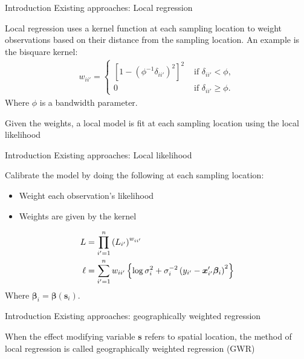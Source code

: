 \documentclass[12pt,t,handout]{beamer}
\newcommand{\subt}[1]{{\footnotesize \color{subtitle} {#1}}}
\begin{document}
\begin{frame}{Introduction}
\subt{Existing approaches: Local regression}

\bigskip
Local regression uses a kernel function at each sampling location to weight observations based on their distance from the sampling location. An example is the bisquare kernel:
\begin{align}
	w_{ii'} = \begin{cases} \left[1-\left(\phi^{-1}\delta_{ii'}\right)^2\right]^2 &\mbox{ if } \delta_{ii'} < \phi, \\ 0 &\mbox{ if } \delta_{ii'} \geq \phi. \end{cases}
\end{align}
Where $\phi$ is a bandwidth parameter.

Given the weights, a local model is fit at each sampling location using the local likelihood \citep{Loader:1999}

\end{frame}






\begin{frame}{Introduction}
\subt{Existing approaches: Local likelihood}

\bigskip
Calibrate the model by doing the following at each sampling location:
\begin{itemize}
    \item Weight each observation's likelihood
    \item Weights are given by the kernel
\end{itemize}

\begin{align}
    L &= \prod_{i'=1}^n \left(L_{i'}\right)^{w_{ii'}} \notag \\
    \ell &= \sum_{i'=1}^n w_{ii'} \left\{\log \sigma_i^{2} + \sigma_i^{-2}\left(y_{i'} - \bm{x}_{i'}'\bm{\beta}_i\right)^2 \right\} \notag
\end{align}
Where $\bm{\beta}_i = \bm{\beta}(\bm{s}_i)$.

\end{frame}



\begin{frame}{Introduction}
\subt{Existing approaches: geographically weighted regression}

\bigskip
When the effect modifying variable $\bm{s}$ refers to spatial location, the method of local regression is called geographically weighted regression (GWR) \citep{Brundson:1998a, Fotheringham:2002}

\end{frame}
\end{document}
